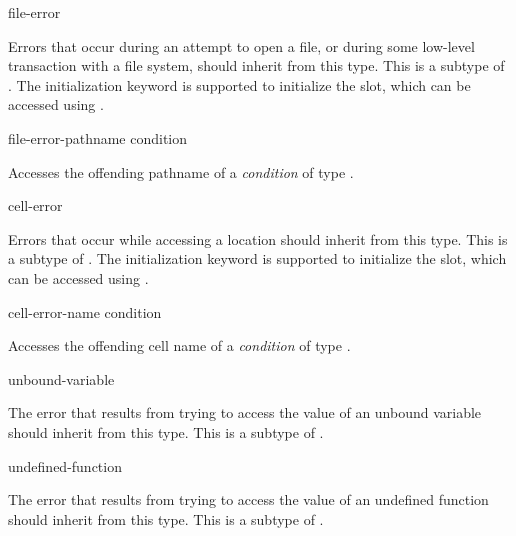 \begin{defun}[Type]
file-error

  Errors that occur during an attempt to open a file, or during some low-level
  transaction with a file system, should inherit from this type. This is a
  subtype of . The initialization keyword  is supported to initialize the
  slot, which can be accessed using .
\end{defun}

\begin{defun}[Function]
file-error-pathname condition

  Accesses the offending pathname of a \emph{condition} of type .
\end{defun}

\begin{defun}[Type]
cell-error

  Errors that occur while accessing a location should inherit from this
  type. This is a subtype of .  The initialization keyword  is supported to 
  initialize the slot, which can be accessed using .
\end{defun}

\begin{defun}[Function]
cell-error-name condition

  Accesses the offending cell name of a \emph{condition} of type .
\end{defun}

\begin{defun}[Type]
unbound-variable

  The error that results from trying to access the value of an unbound
  variable should inherit from this type. This is a subtype of .
\end{defun}

\begin{defun}[Type]
undefined-function

  The error that results from trying to access the value of an undefined
  function should inherit from this type. This is a subtype of .
\end{defun}

